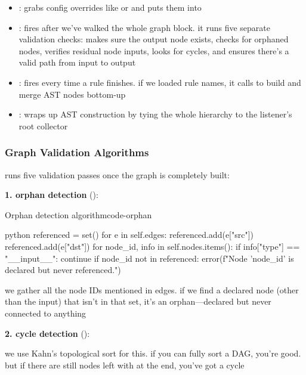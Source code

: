\documentclass{nngraph-en}
\begin{document}
\begin{itemize}
    \item \textbf{}: grabs config overrides like  or  and puts them into 
    \item \textbf{}: fires after we've walked the whole graph block. it runs five separate validation checks: makes sure the output node exists, checks for orphaned nodes, verifies residual node inputs, looks for cycles, and ensures there's a valid path from input to output
    \item \textbf{}: fires every time a rule finishes. if we loaded rule names, it calls  to build and merge AST nodes bottom-up
    \item \textbf{}: wraps up AST construction by tying the whole hierarchy to the listener's root collector
\end{itemize}

\subsubsection{Graph Validation Algorithms}

 runs five validation passes once the graph is completely built:

\textbf{1. orphan detection} ():

\begin{codebox}{Orphan detection algorithm}{code-orphan}
\begin{amzcode}{python}
referenced = set()
for e in self.edges:
    referenced.add(e["src"])
    referenced.add(e["dst"])
for node_id, info in self.nodes.items():
    if info["type"] == "__input__":
        continue
    if node_id not in referenced:
        error(f"Node '{node_id}' is declared but never referenced.")
\end{amzcode}
\end{codebox}

we gather all the node IDs mentioned in edges. if we find a declared node (other than the input) that isn't in that set, it's an orphan---declared but never connected to anything

\textbf{2. cycle detection} ():

we use Kahn's topological sort for this. if you can fully sort a DAG, you're good. but if there are still nodes left with  at the end, you've got a cycle
\end{document}
